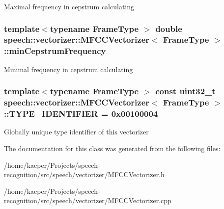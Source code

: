 Maximal frequency in cepstrum calculating \hypertarget{classspeech_1_1vectorizer_1_1MFCCVectorizer_aa457579c8cac5d821a9cc6881d08124b}{
\subsubsection[{min\+Cepstrum\+Frequency}]{\setlength{\rightskip}{0pt plus 5cm}template$<$typename Frame\+Type $>$ double {\bf speech\+::vectorizer\+::\+M\+F\+C\+C\+Vectorizer}$<$ Frame\+Type $>$\+::min\+Cepstrum\+Frequency\hspace{0.3cm}{\ttfamily [protected]}}}\label{classspeech_1_1vectorizer_1_1MFCCVectorizer_aa457579c8cac5d821a9cc6881d08124b}
Minimal frequency in cepstrum calculating \hypertarget{classspeech_1_1vectorizer_1_1MFCCVectorizer_a43112849b3a53dcdeec39a9721e11364}{
\subsubsection[{T\+Y\+P\+E\+\_\+\+I\+D\+E\+N\+T\+I\+F\+I\+E\+R}]{\setlength{\rightskip}{0pt plus 5cm}template$<$typename Frame\+Type $>$ const uint32\+\_\+t {\bf speech\+::vectorizer\+::\+M\+F\+C\+C\+Vectorizer}$<$ Frame\+Type $>$\+::T\+Y\+P\+E\+\_\+\+I\+D\+E\+N\+T\+I\+F\+I\+E\+R = 0x00100004\hspace{0.3cm}{\ttfamily [static]}}}\label{classspeech_1_1vectorizer_1_1MFCCVectorizer_a43112849b3a53dcdeec39a9721e11364}
Globally unique type identifier of this vectorizer 

The documentation for this class was generated from the following files\+:\begin{DoxyCompactItemize}
\item 
/home/kacper/\+Projects/speech-\/recognition/src/speech/vectorizer/M\+F\+C\+C\+Vectorizer.\+h\item 
/home/kacper/\+Projects/speech-\/recognition/src/speech/vectorizer/M\+F\+C\+C\+Vectorizer.\+cpp\end{DoxyCompactItemize}
